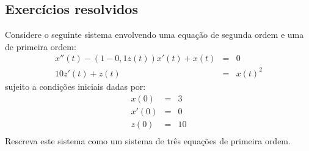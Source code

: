 \subsection*{Exercícios resolvidos}
\begin{exeresol} Considere o seguinte sistema envolvendo uma equação de segunda ordem e uma de primeira ordem:
\begin{eqnarray*}
x''(t)-(1- 0,1 z(t))x'(t)+ x(t)&=&0\\
10 z'(t)+z(t)&=&x(t)^2
\end{eqnarray*}
sujeito a condições iniciais dadas por:
\begin{eqnarray*}
x(0)&=&3\\
x'(0)&=&0\\
z(0)&=&10\\
\end{eqnarray*}
Rescreva este sistema como um sistema de três equações de primeira ordem.
\end{exeresol}
